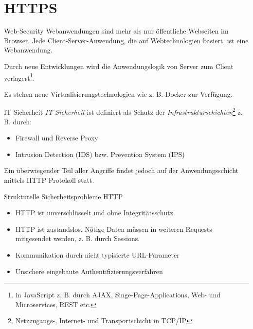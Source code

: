 \section{HTTPS}

\begin{defi}{Web-Security}
    Webanwendungen sind mehr als nur öffentliche Webseiten im Browser.
    Jede Client-Server-Anwendung, die auf Webtechnologien basiert, ist eine Webanwendung.

    Durch neue Entwicklungen wird die Anwendungslogik von Server zum Client verlagert\footnote{in JavaScript z. B. durch AJAX, Singe-Page-Applications, Web- und Microservices, REST etc.}.

    Es stehen neue Virtualisierungstechnologien wie z. B. Docker zur Verfügung.
\end{defi}

\begin{defi}{IT-Sicherheit}
    \emph{IT-Sicherheit} ist definiert als Schutz der \emph{Infrastrukturschichten}\footnote{Netzzugangs-, Internet- und Transportschicht in TCP/IP} z. B. durch:
    \begin{itemize}
        \item Firewall und Reverse Proxy
        \item Intrusion Detection (IDS) bzw. Prevention System (IPS)
    \end{itemize}

    Ein überwiegender Teil aller Angriffe findet jedoch auf der Anwendungsschicht mittels HTTP-Protokoll statt.
\end{defi}

\begin{defi}{Strukturelle Sicherheitsprobleme HTTP}
    \begin{itemize}
        \item HTTP ist unverschlüsselt und ohne Integritätsschutz
        \item HTTP ist zustandslos. Nötige Daten müssen in weiteren Requests mitgesendet werden, z. B. durch Sessions.
        \item Kommunikation durch nicht typisierte URL-Parameter
        \item Unsichere eingebaute Authentifizierungsverfahren
    \end{itemize}
\end{defi}

